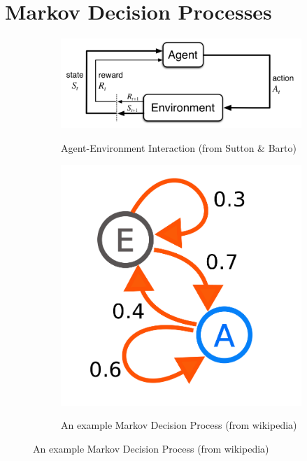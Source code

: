 \documentclass{article}
\begin{document}
\section{Markov Decision Processes}
\begin{figure}[ht]
    \centering
    \begin{subfigure}{0.4\textwidth}
        \centering
        \includegraphics[width=\textwidth]{figures/agent_environment.png}
        \label{fig:agent_environment}
        \caption{Agent-Environment Interaction (from Sutton \& Barto)}
    \end{subfigure}
    \centering
    \begin{subfigure}{0.25\textwidth}
        \centering
        \includegraphics[width=\textwidth]{figures/Markovkate_01.png}
        \label{fig:mdp}
        \caption{An example Markov Decision Process (from wikipedia)}
    \end{subfigure}
\end{figure}
\end{document}
